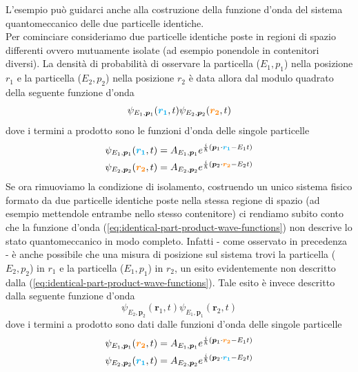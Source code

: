L'esempio può guidarci anche alla costruzione della funzione d'onda del
sistema quantomeccanico delle due particelle identiche.\\
Per cominciare consideriamo due particelle identiche poste in regioni di
spazio differenti ovvero mutuamente isolate (ad esempio ponendole in
contenitori diversi).
La densità di probabilità di osservare la
particella (\(E_{1},p_{1}\)) nella posizione \(r_{1}\) e la particella
(\(E_{2},p_{2}\)) nella posizione \(r_{2}\) è data allora dal modulo
quadrato della seguente funzione d'onda
\begin{equation}
	\psi_{E_{1},\bm{p}_{1}}(\textcolor{cyan}{\bm{r_1}},t) \psi_{E_{2},\bm{p}_{2}}(\textcolor{orange}{\bm{r_2}},t)
	\label{eq:identical-part-product-wave-functions}
\end{equation}
dove i termini a prodotto sono le funzioni d'onda delle singole
particelle \begin{gather*}
	\psi_{E_{1},\bm{p}_{1}}(\textcolor{cyan}{\bm{r_1}},t) = A_{E_{1},\bm{p}_{1}}e^{ \frac{i}{\hbar} (\bm{p}_{1} \cdot \textcolor{cyan}{\bm{r_1}}-E_{1}t)}\\
	\psi_{E_{2},\bm{p}_{2}}(\textcolor{orange}{\bm{r_2}},t) = A_{E_{2},\bm{p}_{2}}e^{ \frac{i}{\hbar} (\bm{p}_{2} \cdot \textcolor{orange}{\bm{r_2}}-E_{2}t)}
\end{gather*}
Se ora rimuoviamo la condizione di isolamento, costruendo un unico
sistema fisico formato da due particelle identiche poste nella stessa
regione di spazio (ad esempio mettendole entrambe nello stesso
contenitore) ci rendiamo subito conto che la funzione d'onda (\ref{eq:identical-part-product-wave-functions})
non descrive lo stato quantomeccanico in modo completo.
Infatti - come
osservato in precedenza - è anche possibile che una misura di posizione
sul sistema trovi la particella (\(E_{2},p_{2}\)) in \(r_{1}\) e la
particella (\(E_{1},p_{1}\)) in \(r_{2}\), un esito evidentemente non
descritto dalla (\ref{eq:identical-part-product-wave-functions}).
Tale esito è invece descritto dalla seguente funzione d'onda
\begin{equation}
	\psi_{E_{2},\bm{p}_{2}}(\bm{r}_{1},t) \psi_{E_{1},\bm{p}_{1}}(\bm{r}_{2},t)
	\label{eq:identical-part-product-wave-functions-2}
\end{equation} dove i termini a prodotto sono dati dalle funzioni d'onda
delle singole particelle
\begin{gather*}
	\psi_{E_{1},\bm{p}_{1}}(\textcolor{orange}{\bm{r_2}},t) = A_{E_{1},\bm{p}_{1}}e^{ \frac{i}{\hbar} (\bm{p}_{1} \cdot \textcolor{orange}{\bm{r_2}}-E_{1}t)}\\
	\psi_{E_{2},\bm{p}_{2}}(\textcolor{cyan}{\bm{r_1}},t) = A_{E_{2},\bm{p}_{2}}e^{ \frac{i}{\hbar} (\bm{p}_{2} \cdot \textcolor{cyan}{\bm{r_1}}-E_{2}t)}
\end{gather*}
